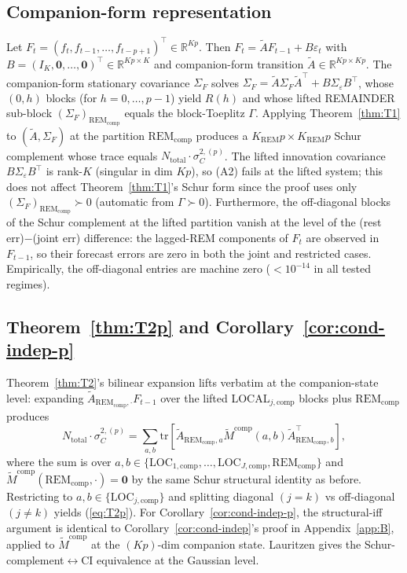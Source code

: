 \documentclass[11pt,letterpaper]{article}
\theoremstyle{remark}
\newcommand{\REM}{\mathrm{REM}}
\newcommand{\LOC}{\mathrm{LOC}}
\newcommand{\Sigmae}{\Sigma_\varepsilon}
\newcommand{\Ntot}{N_{\mathrm{total}}}
\newcommand{\trace}{\mathrm{tr}}
\begin{document}
\subsection{Companion-form representation}

Let $F_t = (f_t, f_{t-1}, \ldots, f_{t-p+1})^\top \in \mathbb{R}^{Kp}$. Then $F_t = \widetilde A F_{t-1} + B \varepsilon_t$ with $B = (I_K, \mathbf{0}, \ldots, \mathbf{0})^\top \in \mathbb{R}^{Kp \times K}$ and companion-form transition $\widetilde A \in \mathbb{R}^{Kp \times Kp}$. The companion-form stationary covariance $\Sigma_F$ solves $\Sigma_F = \widetilde A \Sigma_F \widetilde A^\top + B \Sigmae B^\top$, whose $(0, h)$ blocks (for $h = 0, \ldots, p-1$) yield $R(h)$ and whose lifted REMAINDER sub-block $(\Sigma_F)_{\REM_\text{comp}}$ equals the block-Toeplitz $\Gamma$. Applying Theorem~\ref{thm:T1} to $(\widetilde A, \Sigma_F)$ at the partition $\REM_\text{comp}$ produces a $K_\REM p \times K_\REM p$ Schur complement whose trace equals $\Ntot \cdot \sigma^{2,(p)}_C$. The lifted innovation covariance $B \Sigmae B^\top$ is rank-$K$ (singular in dim $Kp$), so (A2) fails at the lifted system; this does not affect Theorem~\ref{thm:T1}'s Schur form since the proof uses only $(\Sigma_F)_{\REM_\text{comp}} \succ 0$ (automatic from $\Gamma \succ 0$). Furthermore, the off-diagonal blocks of the Schur complement at the lifted partition vanish at the level of the (rest err)$-$(joint err) difference: the lagged-REM components of $F_t$ are observed in $F_{t-1}$, so their forecast errors are zero in both the joint and restricted cases. Empirically, the off-diagonal entries are machine zero ($< 10^{-14}$ in all tested regimes).

\subsection{Theorem~\ref{thm:T2p} and Corollary~\ref{cor:cond-indep-p}}

Theorem~\ref{thm:T2}'s bilinear expansion lifts verbatim at the companion-state level: expanding $\widetilde A_{\REM_\text{comp}, \cdot} F_{t-1}$ over the lifted LOCAL$_{j, \text{comp}}$ blocks plus $\REM_\text{comp}$ produces
\begin{equation}
\Ntot \cdot \sigma^{2,(p)}_C = \sum_{a, b} \trace[\widetilde A_{\REM_\text{comp}, a} \widetilde M^\text{comp}(a, b) \widetilde A_{\REM_\text{comp}, b}^\top],
\end{equation}
where the sum is over $a, b \in \{\LOC_{1, \text{comp}}, \ldots, \LOC_{J, \text{comp}}, \REM_\text{comp}\}$ and $\widetilde M^\text{comp}(\REM_\text{comp}, \cdot) = \mathbf{0}$ by the same Schur structural identity as before. Restricting to $a, b \in \{\LOC_{j, \text{comp}}\}$ and splitting diagonal $(j = k)$ vs off-diagonal $(j \ne k)$ yields (\ref{eq:T2p}). For Corollary~\ref{cor:cond-indep-p}, the structural-iff argument is identical to Corollary~\ref{cor:cond-indep}'s proof in Appendix~\ref{app:B}, applied to $\widetilde M^\text{comp}$ at the $(Kp)$-dim companion state. Lauritzen \cite[\S 5.1.3]{Lauritzen1996} gives the Schur-complement$\leftrightarrow$CI equivalence at the Gaussian level.
\end{document}
